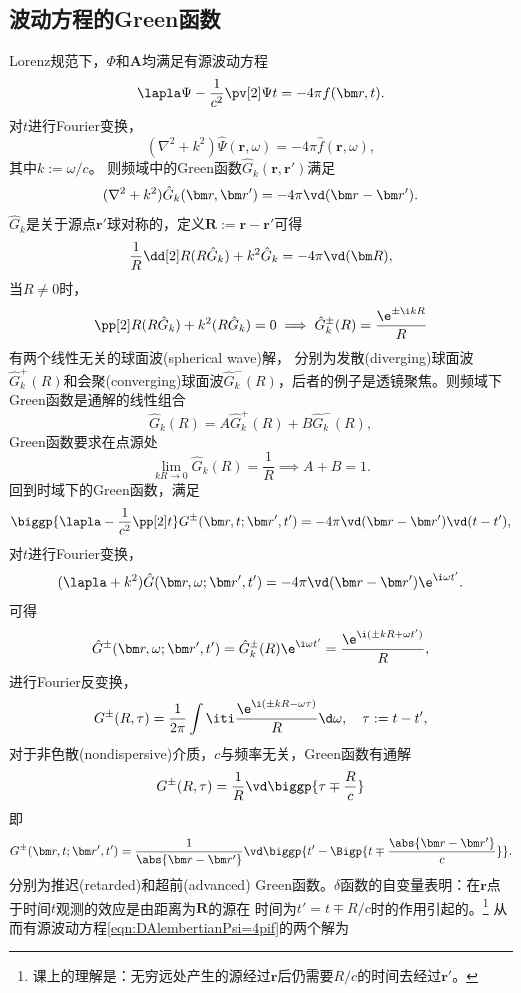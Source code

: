 \subsection{波动方程的Green函数}
Lorenz规范下，$\Phi$和$\bm A$均满足有源波动方程
\begin{equation}
    \label{eqn:DAlembertianPsi=4pif}
    \lapla\Psi-\frac1{c^2}\pv[2]\Psi t=-4\pi f(\bm r,t).
\end{equation}
对$t$进行Fourier变换，%
\[
    (\nabla^2+k^2)\hat\Psi(\bm r,\omega)=-4\pi\hat f(\bm r,\omega),
\]
其中$k:=\omega/c$。
则频域中的Green函数$\hat G_k(\bm r,\bm r')$满足
\[
    (\nabla^2+k^2)\hat G_k(\bm r,\bm r')=-4\pi\vd(\bm r-\bm r').
\]
$\hat G_k$是关于源点$\bm r'$球对称的，定义$\bm R:=\bm r-\bm r'$可得
\[
    \frac1R\dd[2]R(R\hat G_k)+k^2\hat G_k=-4\pi\vd(\bm R),
\]
当$R\neq 0$时， 
\[
    \pp[2]R(R\hat G_k)+k^2(R\hat G_k)=0\implies \hat G_k^\pm(R)=\frac{\e^{\pm\i kR}}R
\]
有两个线性无关的球面波(spherical wave)解，
分别为发散(diverging)球面波$\hat G_k^+(R)$和会聚(converging)球面波$\hat G_k^-(R)$，后者的例子是透镜聚焦。则频域下Green函数是通解的线性组合
\[
    \hat G_k(R)=A\hat G_k^+(R)+B\hat G_k^-(R),
\]
Green函数要求在点源处
\[
    \lim_{kR\to0}\hat G_k(R)=\frac1R\implies A+B=1.
\]
回到时域下的Green函数，满足
\[
    \biggp{\lapla-\frac1{c^2}\pp[2]t}G^\pm(\bm r,t;\bm r',t')=-4\pi\vd(\bm r-\bm r')\vd(t-t'),
\]
对$t$进行Fourier变换， 
\[
    (\lapla+k^2)\hat G(\bm r,\omega;\bm r',t')=-4\pi\vd(\bm r-\bm r')\e^{\i\omega t'}.
\]
可得 
\[
    \hat G^\pm(\bm r,\omega;\bm r',t')=\hat G_k^\pm(R)\e^{\i\omega t'}=\frac{\e^{\i(\pm kR+\omega t')}}R,
\]
进行Fourier反变换，
\[
    G^\pm(R,\tau)=\frac1{2\pi}\int\iti\frac{\e^{\i(\pm kR-\omega\tau)}}R\d\omega,\quad\tau:=t-t',
\]
对于非色散(nondispersive)介质，$c$与频率无关，Green函数有通解
\[
    G^\pm(R,\tau)=\frac1R\vd\biggp{\tau\mp\frac Rc}
\]
即
\begin{equation}
    G^\pm(\bm r,t;\bm r',t')=\frac1{\abs{\bm r-\bm r'}}\vd\biggp{t'-\Bigp{t\mp\frac{\abs{\bm r-\bm r'}}c}}.
\end{equation}
分别为推迟(retarded)和超前(advanced) Green函数。$\delta$函数的自变量表明：在$\bm r$点于时间$t$观测的效应是由距离为$\bm R$的源在%
时间为$t'=t\mp R/c$时的作用引起的。\footnote{课上的理解是：无穷远处产生的源经过$\bm r$后仍需要$R/c$的时间去经过$\bm r'$。}
从而有源波动方程\eqref{eqn:DAlembertianPsi=4pif}的两个解为 
